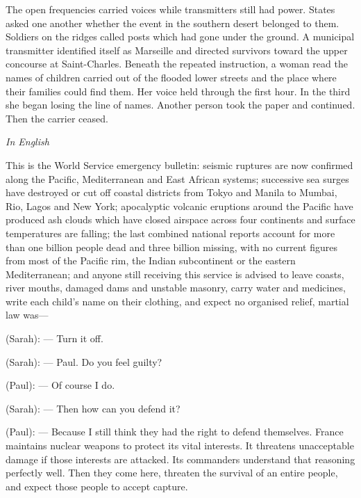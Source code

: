 The open frequencies carried voices while transmitters still had power. States asked one another whether the event in the southern desert belonged to them. Soldiers on the ridges called posts which had gone under the ground. A municipal transmitter identified itself as Marseille and directed survivors toward the upper concourse at Saint-Charles. Beneath the repeated instruction, a woman read the names of children carried out of the flooded lower streets and the place where their families could find them. Her voice held through the first hour. In the third she began losing the line of names. Another person took the paper and continued. Then the carrier ceased.\par
\begin{room}

\textit{In English}

\begin{scripture}This is the World Service emergency bulletin: seismic ruptures are now confirmed along the Pacific, Mediterranean and East African systems; successive sea surges have destroyed or cut off coastal districts from Tokyo and Manila to Mumbai, Rio, Lagos and New York; apocalyptic volcanic eruptions around the Pacific have produced ash clouds which have closed airspace across four continents and surface temperatures are falling; the last combined national reports account for more than one billion people dead and three billion missing, with no current figures from most of the Pacific rim, the Indian subcontinent or the eastern Mediterranean; and anyone still receiving this service is advised to leave coasts, river mouths, damaged dams and unstable masonry, carry water and medicines, write each child's name on their clothing, and expect no organised relief, martial law was---
\end{scripture}

(Sarah): --- Turn it off.

(Sarah): --- Paul. Do you feel guilty?

(Paul): --- Of course I do.

(Sarah): --- Then how can you defend it?

(Paul): --- Because I still think they had the right to defend themselves. France maintains nuclear weapons to protect its vital interests. It threatens unacceptable damage if those interests are attacked. Its commanders understand that reasoning perfectly well. Then they come here, threaten the survival of an entire people, and expect those people to accept capture.


\end{room}
